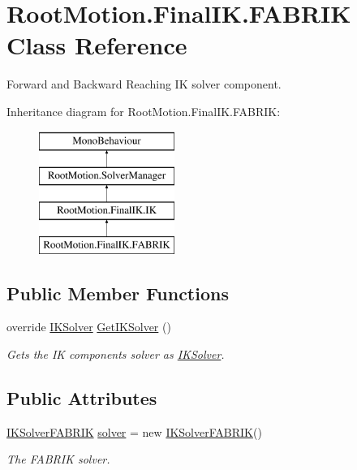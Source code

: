 \hypertarget{class_root_motion_1_1_final_i_k_1_1_f_a_b_r_i_k}{}\section{Root\+Motion.\+Final\+I\+K.\+F\+A\+B\+R\+IK Class Reference}
\label{class_root_motion_1_1_final_i_k_1_1_f_a_b_r_i_k}


Forward and Backward Reaching IK solver component.  


Inheritance diagram for Root\+Motion.\+Final\+I\+K.\+F\+A\+B\+R\+IK\+:\begin{figure}[H]
\begin{center}
\leavevmode
\includegraphics[height=4.000000cm]{class_root_motion_1_1_final_i_k_1_1_f_a_b_r_i_k}
\end{center}
\end{figure}
\subsection*{Public Member Functions}
\begin{DoxyCompactItemize}
\item 
override \mbox{\hyperlink{class_root_motion_1_1_final_i_k_1_1_i_k_solver}{I\+K\+Solver}} \mbox{\hyperlink{class_root_motion_1_1_final_i_k_1_1_f_a_b_r_i_k_a981c902f3f99de1bc37988fbd2226ce7}{Get\+I\+K\+Solver}} ()
\begin{DoxyCompactList}\small\item\em Gets the IK component\textquotesingle{}s solver as \mbox{\hyperlink{class_root_motion_1_1_final_i_k_1_1_i_k_solver}{I\+K\+Solver}}. \end{DoxyCompactList}\end{DoxyCompactItemize}
\subsection*{Public Attributes}
\begin{DoxyCompactItemize}
\item 
\mbox{\hyperlink{class_root_motion_1_1_final_i_k_1_1_i_k_solver_f_a_b_r_i_k}{I\+K\+Solver\+F\+A\+B\+R\+IK}} \mbox{\hyperlink{class_root_motion_1_1_final_i_k_1_1_f_a_b_r_i_k_a190159670a8a9580a984a3f4d7e888f2}{solver}} = new \mbox{\hyperlink{class_root_motion_1_1_final_i_k_1_1_i_k_solver_f_a_b_r_i_k}{I\+K\+Solver\+F\+A\+B\+R\+IK}}()
\begin{DoxyCompactList}\small\item\em The F\+A\+B\+R\+IK solver. \end{DoxyCompactList}\end{DoxyCompactItemize}
